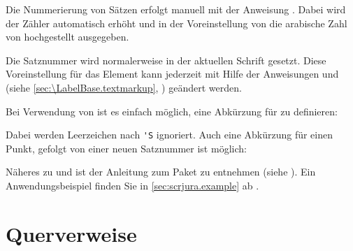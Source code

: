 \begin{Declaration}
\end{Declaration}
Die Nummerierung von Sätzen erfolgt manuell mit der Anweisung
. Dabei wird der Zähler  automatisch erhöht
und in der Voreinstellung von
 die arabische
Zahl von  hochgestellt ausgegeben.

%
Die Satznummer wird
normalerweise in der aktuellen Schrift gesetzt. Diese
Voreinstellung für das Element  kann jederzeit mit
Hilfe der Anweisungen %
 und
 (siehe
\autoref{sec:\LabelBase.textmarkup}, )
geändert werden.%

Bei Verwendung von
 ist es einfach
möglich, eine Abkürzung für  zu definieren:%
\label{sec:scrjura.shorthandexample}%
\begin{lstcode}[moretexcs={useshorthands,defineshorthand}]
\end{lstcode}
Dabei werden Leerzeichen nach
\lstinline|'S| ignoriert. Auch eine
Abkürzung für einen Punkt, gefolgt von einer neuen Satznummer ist möglich:
\begin{lstcode}[moretexcs={useshorthands,defineshorthand}]
\end{lstcode}
Näheres zu  und
 ist der Anleitung zum Paket
 zu entnehmen (siehe \cite{package:babel}). Ein
Anwendungsbeispiel finden Sie in \autoref{sec:scrjura.example} ab
.%
\EndIndexGroup
%
\EndIndexGroup
%
\EndIndexGroup
%
\EndIndexGroup


\section{Querverweise}
\label{sec:scrjura.ref}

